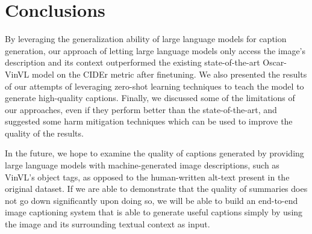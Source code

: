 \documentclass[11pt]{article}
\begin{document}
\section{Conclusions}
\label{sec:7}

By leveraging the generalization ability of large language models for caption generation, our approach of letting large language models only access the image's description and its context outperformed the existing state-of-the-art Oscar-VinVL model on the CIDEr metric after finetuning. We also presented the results of our attempts of leveraging zero-shot learning techniques to teach the model to generate high-quality captions. Finally, we discussed some of the limitations of our approaches, even if they perform better than the state-of-the-art, and suggested some harm mitigation techniques which can be used to improve the quality of the results.

In the future, we hope to examine the quality of captions generated by providing large language models with machine-generated image descriptions, such as VinVL's object tags, as opposed to the human-written alt-text present in the original dataset. If we are able to demonstrate that the quality of summaries does not go down significantly upon doing so, we will be able to build an end-to-end image captioning system that is able to generate useful captions simply by using the image and its surrounding textual context as input.



\end{document}
